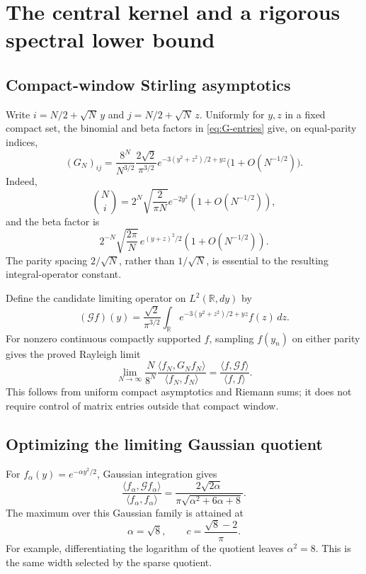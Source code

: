 \documentclass[11pt,reqno]{amsart}
\theoremstyle{definition}\newtheorem{definition}[theorem]{Definition}
\theoremstyle{remark}\newtheorem{remark}[theorem]{Remark}
\newcommand{\RR}{\mathbb R}
\newcommand{\ip}[2]{\langle #1,#2\rangle}
\begin{document}
\section{The central kernel and a rigorous spectral lower bound}
\subsection{Compact-window Stirling asymptotics}
Write $i=N/2+\sqrt N\,y$ and $j=N/2+\sqrt N\,z$.
Uniformly for $y,z$ in a fixed compact set, the binomial and beta
factors in \eqref{eq:G-entries} give, on equal-parity indices,
\begin{equation}\label{eq:G-local}
(G_N)_{ij}=\frac{8^N}{N^{3/2}}\frac{2\sqrt2}{\pi^{3/2}}
 e^{-3(y^2+z^2)/2+yz}\bigl(1+O(N^{-1/2})\bigr).
\end{equation}
Indeed,
\[
\binom Ni=2^N\sqrt{\frac2{\pi N}}e^{-2y^2}
(1+O(N^{-1/2})),
\]
and the beta factor is
\[
2^{-N}\sqrt{\frac{2\pi}N}\,e^{(y+z)^2/2}
(1+O(N^{-1/2})).
\]
The parity spacing $2/\sqrt N$, rather than $1/\sqrt N$, is essential
to the resulting integral-operator constant.

Define the candidate limiting operator on $L^2(\RR,dy)$ by
\begin{equation}\label{eq:limiting-kernel}
(\mathcal Gf)(y)=\frac{\sqrt2}{\pi^{3/2}}
\int_{\RR}e^{-3(y^2+z^2)/2+yz}f(z)\,dz.
\end{equation}
For nonzero continuous compactly supported $f$, sampling $f(y_n)$
on either parity gives the proved Rayleigh limit
\begin{equation}\label{eq:compact-Rayleigh}
\lim_{N\to\infty}\frac N{8^N}
\frac{\ip{f_N}{G_Nf_N}}{\ip{f_N}{f_N}}
=\frac{\ip f{\mathcal Gf}}{\ip f f}.
\end{equation}
This follows from uniform compact asymptotics and Riemann sums; it
does not require control of matrix entries outside that compact window.

\subsection{Optimizing the limiting Gaussian quotient}
For $f_\alpha(y)=e^{-\alpha y^2/2}$, Gaussian integration gives
\begin{equation}\label{eq:limiting-Rayleigh}
\frac{\ip{f_\alpha}{\mathcal Gf_\alpha}}{\ip{f_\alpha}{f_\alpha}}
=\frac{2\sqrt{2\alpha}}{\pi\sqrt{\alpha^2+6\alpha+8}}.
\end{equation}
The maximum over this Gaussian family is attained at
\begin{equation}\label{eq:optimal-parameters}
\alpha=\sqrt8,\qquad c=\frac{\sqrt8-2}{\pi}.
\end{equation}
For example, differentiating the logarithm of the quotient leaves
$\alpha^2=8$. This is the same width selected by the sparse quotient.
\end{document}
